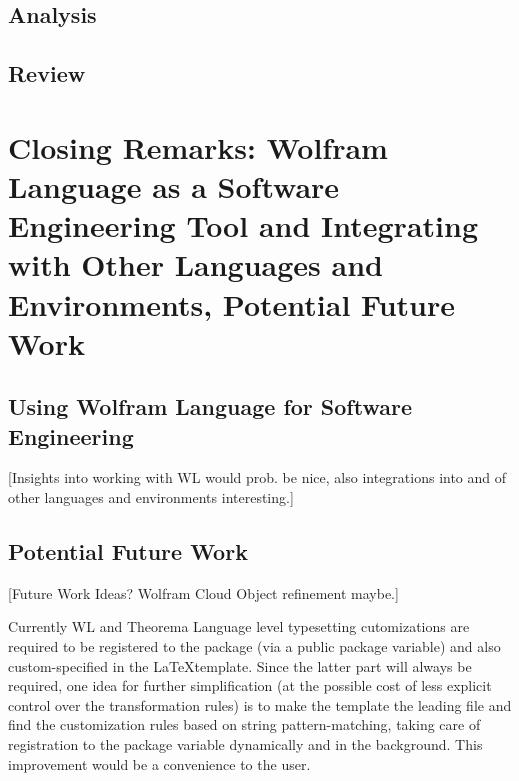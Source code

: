 \subsection{Analysis}

\subsection{Review}


\section{Closing Remarks: Wolfram Language as a Software Engineering Tool and Integrating with Other Languages and Environments, Potential Future Work}

\subsection{Using Wolfram Language for Software Engineering}

[Insights into working with WL would prob. be nice, also integrations into and of other languages and environments interesting.]

\subsection{Potential Future Work}

[Future Work Ideas? Wolfram Cloud Object refinement maybe.]

Currently WL and Theorema Language level typesetting cutomizations are required to be registered to the package (via a public package variable) and also custom-specified in the \LaTeX template. Since the latter part will always be required, one idea for further simplification (at the possible cost of less explicit control over the transformation rules) is to make the template the leading file and find the customization rules based on string pattern-matching, taking care of registration to the package variable dynamically and in the background. This improvement would be a convenience to the user.